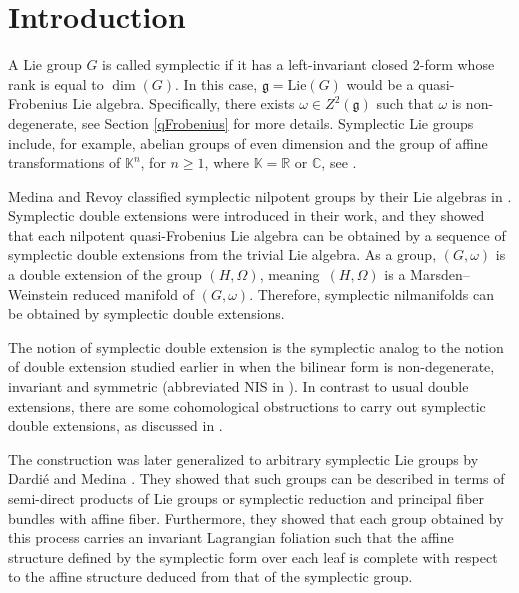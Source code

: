 \documentclass[pdftex]{sigma}
\numberwithin{equation}{section}
\begin{document}


\renewcommand{\thefootnote}{\arabic{footnote}}
\setcounter{footnote}{0}

\section{Introduction} %

A Lie group $G$ is called symplectic if it has a left-invariant closed 2-form whose rank is equal to $\dim(G)$. In this case, $\mathfrak{g} = \mathrm{Lie}(G)$ would be a quasi-Frobenius Lie algebra. Specifically, there exists $\omega \in Z^2(\mathfrak{g})$ such that $\omega$ is non-degenerate, see Section \ref{qFrobenius} for more details. Symplectic Lie groups include, for example, abelian groups of even dimension and the group of affine transformations of ${\mathbb K}^n$, for $n\geq 1$, where ${\mathbb K}={\mathbb R}$ or ${\mathbb C}$, see \cite{BC, MR2}.

Medina and Revoy classified symplectic nilpotent groups by their Lie algebras in \cite{MR2}. Symplectic double extensions were introduced in their work, and they showed that each nilpotent quasi-Frobenius Lie algebra can be obtained by a sequence of symplectic double extensions from the trivial Lie algebra. As a group, $(G, \omega)$ is a double extension of the group $(H, \Omega)$, meaning~$(H, \Omega)$ is a Marsden--Weinstein reduced manifold of $(G, \omega)$. Therefore, symplectic nilmanifolds can be obtained by symplectic double extensions.

The notion of symplectic double extension is the symplectic analog to the notion of double extension studied earlier in \cite{FS, MR1} when the bilinear form is non-degenerate, invariant and symmetric (abbreviated NIS in \cite{BKLS}). In contrast to usual double extensions, there are some cohomological obstructions to carry out symplectic double extensions, as discussed in \cite{MR2}.

The construction was later generalized to arbitrary symplectic Lie groups by Dardi\'e and Medina \cite{DM1}. They showed that such groups can be described in terms of semi-direct products of Lie groups or symplectic reduction and principal fiber bundles with affine fiber. Furthermore, they showed that each group obtained by this process carries an invariant Lagrangian foliation such that the affine structure defined by the symplectic form over each leaf is complete with respect to the affine structure deduced from that of the symplectic group.
\end{document}
